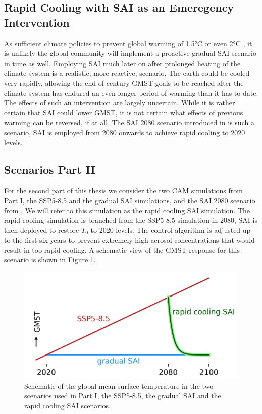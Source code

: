 \subsection{Rapid Cooling with SAI as an Emeregency Intervention}
As sufficient climate policies to prevent global warming of 1.5°C or even 2°C \parencite{NDCsynth}, it is unlikely the global community will implement a proactive gradual SAI scenario in time as well. Employing SAI much later on after prolonged heating of the climate system is a realistic, more reactive, scenario. The earth could be cooled very rapidly, allowing the end-of-century GMST goals to be reached after the climate system has endured an even longer period of warming than it has to date. The effects of such an intervention are largely uncertain. While it is rather certain that SAI could lower GMST, it is not certain what effects of previous warming can be reversed, if at all. The SAI 2080 scenario introduced in \textcite{pfluger2024} is such a scenario, SAI is employed from 2080 onwards to achieve rapid cooling to 2020 levels. 

\subsection{Scenarios Part II}
For the second part of this thesis we consider the two CAM simulations from Part I, the SSP5-8.5 and the gradual SAI simulations, and the SAI 2080 scenario from \textcite{pfluger2024}. We will refer to this simulation as the rapid cooling SAI simulation. The rapid cooling simulation is branched from the SSP5-8.5 simulation in 2080, SAI is then deployed to restore $T_0$ to 2020 levels. The control algorithm is adjusted up to the first six years to prevent extremely high aerosol concentrations that would result in too rapid cooling. A schematic view of the GMST response for this scenario is shown in Figure \ref{fig:schematic_scens}.

\begin{figure}[H]
    \centering
    \includegraphics[width=0.65\linewidth]{images/schematic_scens.png}
    \caption{Schematic of the global mean surface temperature in the two scenarios used in Part I, the SSP5-8.5, the gradual SAI and the rapid cooling SAI scenarios.}  
    \label{fig:schematic_scens}  
\end{figure}


